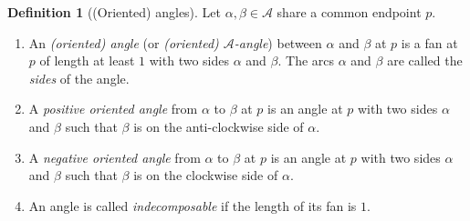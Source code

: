 \documentclass[a4paper,10pt]{amsart}
\theoremstyle{plain}          %
\theoremstyle{definition}
\newtheorem{definition}[theorem]{Definition}
\newcommand{\ie}{{\em i.e.}\ }
\begin{document}
\begin{definition}[(Oriented) angles]
Let $\alpha, \beta \in \mathcal{A}$ share a common endpoint $p$.
\begin{enumerate}
    \item An {\it (oriented) angle} (or {\it (oriented) $\mathcal{A}$-angle}) between $\alpha$ and $\beta$ at $p$ is a fan at $p$ of length at least $1$ with two sides $\alpha$ and $\beta$. The arcs $\alpha$ and $\beta$ are called the {\it sides} of the angle.
    
    \item A \textit{positive oriented angle} from $\alpha$ to $\beta$ at $p$ is an angle at $p$ with two sides $\alpha$ and $\beta$ such that $\beta$ is on the anti-clockwise side of $\alpha$.
    
    \item A \textit{negative oriented angle} from $\alpha$ to $\beta$ at $p$ is an angle at $p$ with two sides $\alpha$ and $\beta$ such that $\beta$ is on the clockwise side of $\alpha$.
    
    \item An angle is called \emph{indecomposable} if the length of its fan is $1$.
\end{enumerate}
\end{definition}


    
\end{document}
